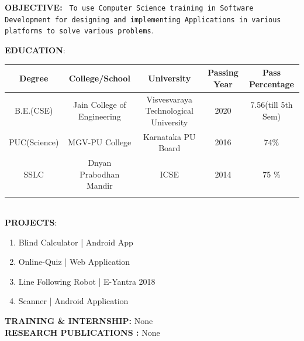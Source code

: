 \documentclass{article}
\begin{document}
		
\large \textbf{OBJECTIVE:}
	\texttt{	
	To use Computer Science training in Software Development for designing and implementing Applications in various platforms to solve various problems}.
\vspace{\baselineskip}
	
	\large \textbf{EDUCATION}:
	
	\begin{tabular}{|c|c|c|c|c|}
	\small Degree & \small College/School & \small University & \small Passing Year & \small Pass Percentage \\
		\hline
		\footnotesize  B.E.(CSE)  & \footnotesize Jain College of Engineering & \footnotesize Visvesvaraya Technological University & \footnotesize 2020 & \footnotesize 7.56(till 5th Sem) \\
		\footnotesize PUC(Science) & \footnotesize MGV-PU College & \footnotesize Karnataka PU Board & \footnotesize 2016 &\footnotesize 74\%  \\
		\footnotesize SSLC & \footnotesize Dnyan Prabodhan Mandir & \footnotesize ICSE & \footnotesize 2014 & \footnotesize 75 \%  \\

\vspace{\baselineskip}
	\end{tabular}
\\
	\large \textbf{PROJECTS}:
	\begin{enumerate}
		\item Blind Calculator | Android App
		\item Online-Quiz | Web Application
		\item Line Following Robot | E-Yantra 2018
		\item Scanner | Android Application
		
		\vspace{\baselineskip}
	\end{enumerate}
	\large \textbf{TRAINING \&
		INTERNSHIP:}	
	None
	\\
	\large \textbf{RESEARCH PUBLICATIONS :}	
	None
	\\
	
	
\end{document}
